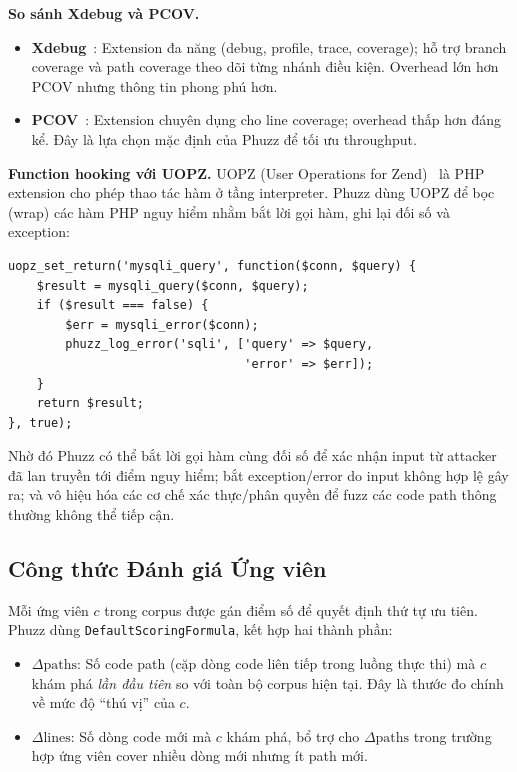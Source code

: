 \textbf{So sánh Xdebug và PCOV.}

\begin{itemize}
    \item \textbf{Xdebug}~\cite{rethans2002xdebug}: Extension đa năng (debug,
    profile, trace, coverage); hỗ trợ branch coverage và path coverage theo
    dõi từng nhánh điều kiện. Overhead lớn hơn PCOV nhưng thông tin phong
    phú hơn.
    \item \textbf{PCOV}~\cite{watkins2023pcov}: Extension chuyên dụng cho
    line coverage; overhead thấp hơn đáng kể. Đây là lựa chọn mặc định của
    Phuzz để tối ưu throughput.
\end{itemize}

\textbf{Function hooking với UOPZ.} UOPZ (User Operations for
Zend)~\cite{phpgroup2023uopz} là PHP extension cho phép thao tác hàm ở tầng
interpreter. Phuzz dùng UOPZ để bọc (wrap) các hàm PHP nguy hiểm nhằm bắt
lời gọi hàm, ghi lại đối số và exception:

\begin{verbatim}
uopz_set_return('mysqli_query', function($conn, $query) {
    $result = mysqli_query($conn, $query);
    if ($result === false) {
        $err = mysqli_error($conn);
        phuzz_log_error('sqli', ['query' => $query,
                                 'error' => $err]);
    }
    return $result;
}, true);
\end{verbatim}

Nhờ đó Phuzz có thể bắt lời gọi hàm cùng đối số để xác nhận input từ
attacker đã lan truyền tới điểm nguy hiểm; bắt exception/error do input
không hợp lệ gây ra; và vô hiệu hóa các cơ chế xác thực/phân quyền để
fuzz các code path thông thường không thể tiếp cận.

\subsection{Công thức Đánh giá Ứng viên}
\label{subsec:scoring}

Mỗi ứng viên $c$ trong corpus được gán điểm số để quyết định thứ tự ưu tiên.
Phuzz dùng \texttt{DefaultScoringFormula}, kết hợp hai thành phần:

\begin{itemize}
    \item \textbf{$\Delta\text{paths}$}: Số code path (cặp dòng code liên tiếp
    trong luồng thực thi) mà $c$ khám phá \emph{lần đầu tiên} so với toàn bộ
    corpus hiện tại. Đây là thước đo chính về mức độ ``thú vị'' của $c$.
    \item \textbf{$\Delta\text{lines}$}: Số dòng code mới mà $c$ khám phá, bổ
    trợ cho $\Delta\text{paths}$ trong trường hợp ứng viên cover nhiều dòng
    mới nhưng ít path mới.
\end{itemize}


